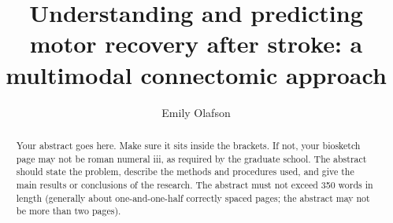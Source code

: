 \documentclass[phd,tocprelim]{cornell}
\title {Understanding and predicting motor recovery after stroke: a multimodal connectomic approach}
\author {Emily Olafson}
\begin{document}
\maketitle
\makecopyright

\begin{abstract}


Your abstract goes here. Make sure it sits inside the brackets. If not,
your biosketch page may not be roman numeral iii, as required by the
graduate school.
The abstract should state the problem, describe the methods and procedures used, and give the main results or conclusions of the research.
The abstract must not exceed 350 words in length (generally about one-and-one-half correctly spaced pages; the abstract may not be more than two pages).
\end{abstract}
\end{document}
